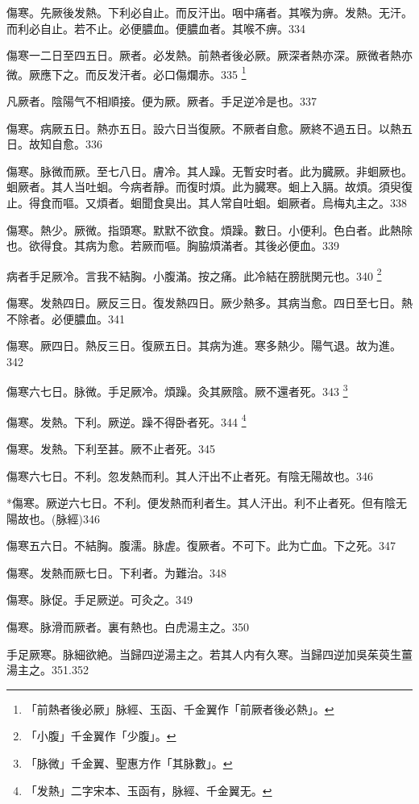 \documentclass[b5paper,twoside,zihao=-4,UTF8]{ctexbook}
\begin{document}
傷寒。先厥後发熱。下利必自止。而反汗出。咽中痛者。其喉为痹。发熱。无汗。而利必自止。若不止。必便膿血。便膿血者。其喉不痹。334

傷寒一二日至四五日。厥者。必发熱。前熱者後必厥。厥深者熱亦深。厥微者熱亦微。厥應下之。而反发汗者。必口傷爛赤。335
	\footnote{「前熱者後必厥」脉經、玉函、千金翼作「前厥者後必熱」。}

凡厥者。陰陽气不相順接。便为厥。厥者。手足逆冷是也。337

傷寒。病厥五日。熱亦五日。設六日当復厥。不厥者自愈。厥終不過五日。以熱五日。故知自愈。336

傷寒。脉微而厥。至七八日。膚冷。其人躁。无暫安时者。此为臓厥。非蛔厥也。蛔厥者。其人当吐蛔。今病者靜。而復时煩。此为臓寒。蛔上入膈。故煩。須臾復止。得食而嘔。又煩者。蛔聞食臭出。其人常自吐蛔。蛔厥者。烏梅丸主之。338

傷寒。熱少。厥微。指頭寒。默默不欲食。煩躁。數日。小便利。色白者。此熱除也。欲得食。其病为愈。若厥而嘔。胸脇煩滿者。其後必便血。339

病者手足厥冷。言我不結胸。小腹滿。按之痛。此冷結在膀胱関元也。340
	\footnote{「小腹」千金翼作「少腹」。}

傷寒。发熱四日。厥反三日。復{发}熱四日。厥少熱多。其病当愈。四日至七日。熱不除者。必便膿血。341

傷寒。厥四日。熱反三日。復厥五日。其病为進。寒多熱少。陽气退。故为進。342

傷寒六七日。脉微。手足厥{冷}。煩躁。灸其厥陰。厥不還者死。343
	\footnote{「脉微」千金翼、聖惠方作「其脉數」。}

傷寒。{发熱。}下利。厥逆。躁不得卧者死。344
	\footnote{「发熱」二字宋本、玉函有，脉經、千金翼无。}

傷寒。发熱。下利至{甚。}厥不止者死。345

傷寒六七日。不利。忽发熱而利。其人汗出不止者死。有陰无陽故也。346

*傷寒。厥逆六七日。不利。便发熱而利者生。其人汗出。利不止者死。但有陰无陽故也。(脉經)346

傷寒五六日。不結胸。腹濡。脉虗。復厥者。不可下。此为亡血。{下之}死。347

傷寒。发熱而厥七日。下利者。为難治。348

傷寒。脉促。手足厥逆。可灸之。349

傷寒。脉滑而厥者。裏有熱也。白虎湯主之。350

手足厥寒。脉細欲絶。当歸四逆湯主之。若其人内有久寒。当歸四逆加吳茱萸生薑湯主之。351.352
\end{document}

